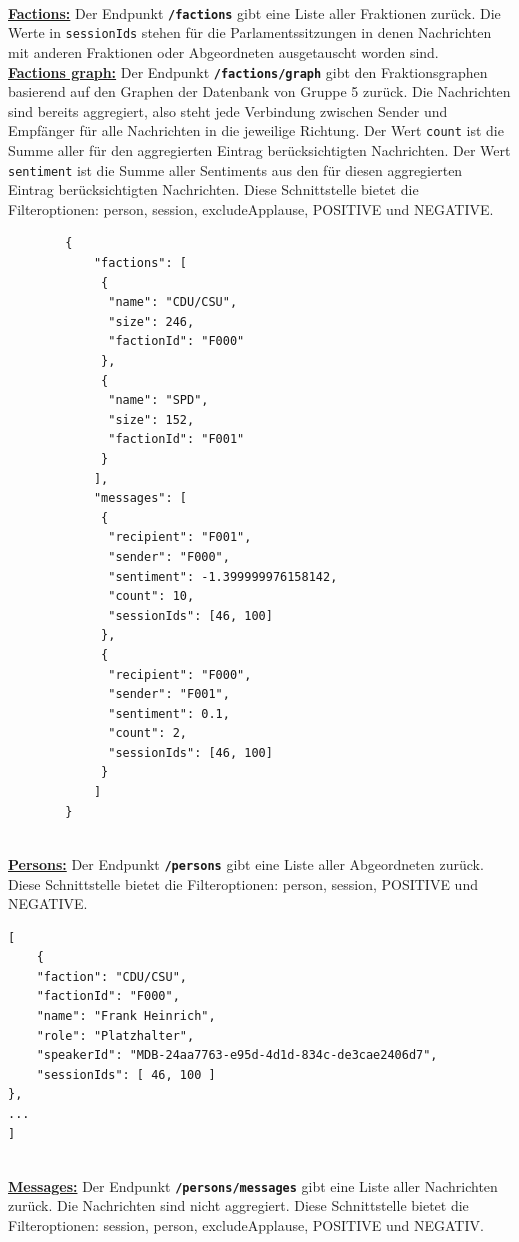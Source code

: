 ~\\	
\textbf{\underline{Factions:}} 
\newline
Der Endpunkt \textbf{\texttt{/factions}} gibt eine Liste aller Fraktionen zurück. Die Werte in \texttt{sessionIds} stehen für die Parlamentssitzungen in denen Nachrichten mit anderen Fraktionen oder Abgeordneten ausgetauscht worden sind.
\newpage
~\\		
\textbf{\underline{Factions graph:}} \newline
Der Endpunkt \textbf{\texttt{/factions/graph}} gibt den Fraktionsgraphen basierend auf den Graphen der Datenbank von Gruppe 5 zurück. Die Nachrichten sind bereits aggregiert, also steht jede Verbindung zwischen Sender und Empfänger für alle Nachrichten in die jeweilige Richtung. Der Wert \texttt{count} ist die Summe aller für den aggregierten Eintrag berücksichtigten Nachrichten. Der Wert \texttt{sentiment} ist die Summe aller Sentiments aus den für diesen aggregierten Eintrag berücksichtigten Nachrichten. Diese Schnittstelle bietet die Filteroptionen: person, session, excludeApplause, POSITIVE und NEGATIVE.	
\begin{lstlisting}
		{
			"factions": [
			 {
			  "name": "CDU/CSU",
			  "size": 246, 
			  "factionId": "F000"
			 },
			 {
			  "name": "SPD",
			  "size": 152,
			  "factionId": "F001"
			 }
			],
			"messages": [
			 {
			  "recipient": "F001",
			  "sender": "F000",
			  "sentiment": -1.399999976158142,
			  "count": 10,
			  "sessionIds": [46, 100]
			 },
			 {
			  "recipient": "F000",
			  "sender": "F001",
			  "sentiment": 0.1,
			  "count": 2,
			  "sessionIds": [46, 100]
			 }
			]
		}
\end{lstlisting}
\newpage
~\\	
\textbf{\underline{Persons:}}\newline
Der Endpunkt \textbf{\texttt{/persons}} gibt eine Liste aller Abgeordneten zurück. Diese Schnittstelle bietet die Filteroptionen: person, session, POSITIVE und NEGATIVE.
\begin{lstlisting}
[
    {
    "faction": "CDU/CSU",
    "factionId": "F000", 
    "name": "Frank Heinrich", 
    "role": "Platzhalter", 
    "speakerId": "MDB-24aa7763-e95d-4d1d-834c-de3cae2406d7",
    "sessionIds": [ 46, 100 ]
}, 
...
]
\end{lstlisting}
~\\
\textbf{\underline{Messages:}}\newline
Der Endpunkt \textbf{\texttt{/persons/messages}} gibt eine Liste aller Nachrichten zurück. Die Nachrichten sind nicht aggregiert. Diese Schnittstelle bietet die Filteroptionen: session, person, excludeApplause, POSITIVE und NEGATIV.	
